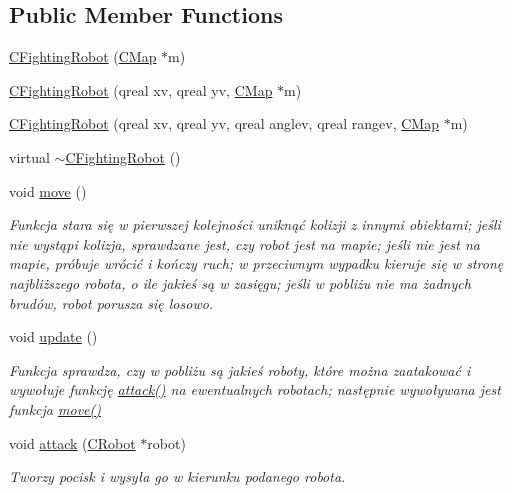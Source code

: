 \subsection*{Public Member Functions}
\begin{DoxyCompactItemize}
\item 
\mbox{\hyperlink{class_c_fighting_robot_a0930ab24dba8a1c3b6f7a6cb693d59bf}{C\+Fighting\+Robot}} (\mbox{\hyperlink{class_c_map}{C\+Map}} $\ast$m)
\item 
\mbox{\hyperlink{class_c_fighting_robot_a65deb458a3628c7c5e7898928e3a077c}{C\+Fighting\+Robot}} (qreal xv, qreal yv, \mbox{\hyperlink{class_c_map}{C\+Map}} $\ast$m)
\item 
\mbox{\hyperlink{class_c_fighting_robot_ab9f9806093c0def1cde010de151c55e5}{C\+Fighting\+Robot}} (qreal xv, qreal yv, qreal anglev, qreal rangev, \mbox{\hyperlink{class_c_map}{C\+Map}} $\ast$m)
\item 
virtual \mbox{\hyperlink{class_c_fighting_robot_aa47308cfbd10635eedebe8063d478a72}{$\sim$\+C\+Fighting\+Robot}} ()
\item 
void \mbox{\hyperlink{class_c_fighting_robot_af644acbba178e256566e9dbd230aa4db}{move}} ()
\begin{DoxyCompactList}\small\item\em Funkcja stara się w pierwszej kolejności uniknąć kolizji z innymi obiektami; jeśli nie wystąpi kolizja, sprawdzane jest, czy robot jest na mapie; jeśli nie jest na mapie, próbuje wrócić i kończy ruch; w przeciwnym wypadku kieruje się w stronę najbliższego robota, o ile jakieś są w zasięgu; jeśli w pobliżu nie ma żadnych brudów, robot porusza się losowo. \end{DoxyCompactList}\item 
void \mbox{\hyperlink{class_c_fighting_robot_a3ae0ea383f809766e53c81348a07daaa}{update}} ()
\begin{DoxyCompactList}\small\item\em Funkcja sprawdza, czy w pobliżu są jakieś roboty, które można zaatakować i wywołuje funkcję \mbox{\hyperlink{class_c_fighting_robot_a6a97cdc69ce705f810d657a31a3afbbd}{attack()}} na ewentualnych robotach; następnie wywoływana jest funkcja \mbox{\hyperlink{class_c_fighting_robot_af644acbba178e256566e9dbd230aa4db}{move()}} \end{DoxyCompactList}\item 
void \mbox{\hyperlink{class_c_fighting_robot_a6a97cdc69ce705f810d657a31a3afbbd}{attack}} (\mbox{\hyperlink{class_c_robot}{C\+Robot}} $\ast$robot)
\begin{DoxyCompactList}\small\item\em Tworzy pocisk i wysyła go w kierunku podanego robota. \end{DoxyCompactList}\end{DoxyCompactItemize}
